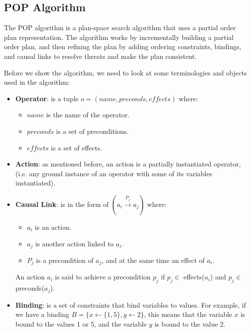 \subsection{POP Algorithm}
The \acf{POP} algorithm is a plan-space search algorithm that uses a partial order plan representation.
The algorithm works by incrementally building a partial order plan, and then refining the plan by adding ordering constraints,
bindings, and causal links to resolve threats and make the plan consistent.

Before we show the algorithm, we need to look at some terminologies and objects used in the algorithm:
\begin{itemize}
  \item \textbf{Operator}: is a tuple $o = (name, preconds, effects)$ where:
        \begin{itemize}
          \item $name$ is the name of the operator.
          \item $preconds$ is a set of preconditions.
          \item $effects$ is a set of effects.
        \end{itemize}
  \item \textbf{Action}: as mentioned before, an action is a partially instantiated operator,
        (i.e. any ground instance of an operator with some of its variables instantiated).

  \item \textbf{Causal Link}: is in the form of $(a_i \xrightarrow{\text{$P_j$}} a_j)$ where:
        \begin{itemize}
          \item $a_i$ is an action.
          \item $a_j$ is another action linked to $a_i$.
          \item $P_j$ is a precondition of $a_j$, and at the same time an effect of $a_i$.
        \end{itemize}
        An action $a_i$ is said to achieve a precondition $p_j$ if $p_j \in$ effects($a_i$) and $p_j \in$ preconds($a_j$).

  \item \textbf{Binding}: is a set of constraints that bind variables to values.
        For example, if we have a binding $B = \{x \leftarrow \{1,5\}, y \leftarrow 2\}$, this means that the variable $x$ is bound to the values 1 or 5,
        and the variable $y$ is bound to the value 2.

\end{itemize}


